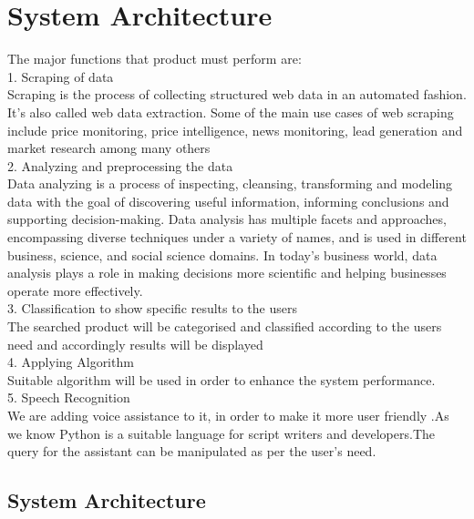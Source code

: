 \section{System Architecture}
The major functions that product must perform are:\\
1. Scraping of data\\
Scraping is the process of collecting structured web data in an automated fashion. It’s
also called web data extraction. Some of the main use cases of web scraping include
price monitoring, price intelligence, news monitoring, lead generation and market
research among many others\\
2. Analyzing and preprocessing the data\\
Data analyzing is a process of inspecting, cleansing, transforming and modeling data
with the goal of discovering useful information, informing conclusions and supporting
decision-making. Data analysis has multiple facets and approaches, encompassing
diverse techniques under a variety of names, and is used in different business, science,
and social science domains. In today’s business world, data analysis plays a role in
making decisions more scientific and helping businesses operate more effectively.\\
3. Classification to show specific results to the users\\
The searched product will be categorised and classified according to the users need
and accordingly results will be displayed\\
4. Applying Algorithm\\
Suitable algorithm will be used in order to enhance the system performance.\\
5. Speech Recognition\\
We are adding voice assistance to it, in order to make it more user friendly .As we
know Python is a suitable language for script writers and developers.The query for
the assistant can be manipulated as per the user’s need.

\subsection{System Architecture}


